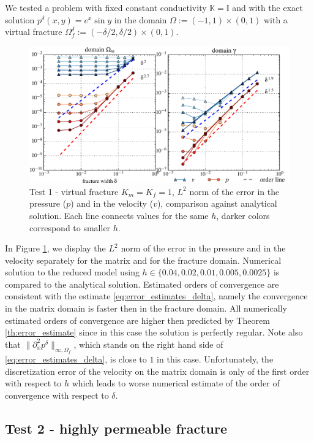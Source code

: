\documentclass{llncs}
\def\prtl{\partial}
\def\tn#1{{\mathbb{#1}}}    %
\def\norm#1{\|#1\|}
\begin{document}
We tested a problem with fixed constant conductivity $\tn K=\tn I$ and with the exact solution $p^\delta(x,y)=e^x\sin y$ in the domain $\Omega:=(-1,1)\times(0,1)$
with a virtual fracture $\Omega_f^\delta:=(-\delta/2,\delta/2)\times(0,1)$.
\begin{figure}
\centering
\includegraphics[scale=0.6]{figures/plot_anal_exp_sin_color.pdf}
\caption{Test 1 - virtual fracture $K_m=K_f=1$, $L^2$ norm of the error in the pressure ($p$) and in the velocity ($v$), comparison against analytical solution.
Each line connects values for the same $h$, darker colors correspond to smaller $h$.}
\label{fig:exp_sin}
\end{figure}
In Figure \ref{fig:exp_sin}, we display the $L^2$ norm of the error in the pressure and in the velocity separately for the matrix and for the fracture domain. 
Numerical solution to the reduced model using $h\in \{0.04, 0.02, 0.01, 0.005, 0.0025\}$ is compared to the analytical solution. Estimated orders of convergence 
are consistent with the estimate \eqref{eq:error_estimates_delta}, namely the convergence in the matrix domain is faster then in the fracture domain. All numerically 
estimated orders of convergence are higher then predicted by Theorem \ref{th:error_estimate} since in this case the solution is perfectly regular. Note also that 
$\norm{\prtl^2_x p^\delta}_{\infty,\Omega_f}$, which stands on the right hand side of \eqref{eq:error_estimates_delta}, is close to $1$ in this case.
Unfortunately, the discretization error of the velocity on the matrix domain is only of the first order with respect to $h$ which leads to worse numerical estimate of the order of convergence with 
respect to $\delta$.


\subsection{Test 2 - highly permeable fracture}
\end{document}
